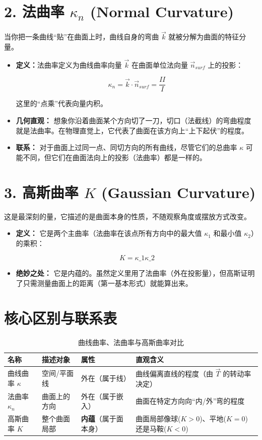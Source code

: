 \section{2. 法曲率 $\kappa_n$ (Normal Curvature)}
当你把一条曲线“贴”在曲面上时，曲线自身的弯曲 $\vec{k}$ 就被分解为曲面的特征分量。
\begin{itemize}
\item \textbf{定义：}法曲率定义为曲线曲率向量 $\vec{k}$ 在曲面单位法向量 $\vec{n}_{surf}$ 上的投影：

$$ \kappa_n = \vec{k} \cdot \vec{n}_{surf} = \frac{II}{I} $$

这里的“点乘”代表向量内积。
\item \textbf{几何直观：} 想象你沿着曲面某个方向切了一刀，切口（法截线）的弯曲程度就是法曲率。在物理直觉上，它代表了曲面在该方向上“上下起伏”的程度。

\item \textbf{联系：} 对于曲面上过同一点、同切方向的所有曲线，尽管它们的总曲率 $\kappa$ 可能不同，但它们在曲面法向上的投影（法曲率）都是一样的。
\end{itemize}
\section{3. 高斯曲率 $K$ (Gaussian Curvature)}
这是最深刻的量，它描述的是曲面本身的性质，不随观察角度或摆放方式改变。
\begin{itemize}
\item \textbf{定义：} 它是两个主曲率（法曲率在该点所有方向中的最大值 $\kappa_1$ 和最小值 $\kappa_2$）的乘积：

$$ K = \kappa\_1 \kappa\_2 $$
\item \textbf{绝妙之处：} 它是内蕴的。虽然定义里用了法曲率（外在投影量），但高斯证明了只需测量曲面上的距离（第一基本形式）就能算出来。
\end{itemize}
\section{核心区别与联系表}
\begin{table}[htbp]
\centering
\renewcommand{\arraystretch}{1.5}
\caption{曲线曲率、法曲率与高斯曲率对比}
\begin{tabular}{@{}llll@{}}
\toprule
\textbf{名称} & \textbf{描述对象} & \textbf{属性} & \textbf{直观含义} \\ \midrule
曲线曲率 $\kappa$ & 空间/平面线 & 外在（属于线） & 曲线偏离直线的程度（由 $\vec{T}$ 的转动率决定） \\
法曲率 $\kappa_n$ & 曲面上的方向 & 外在（属于嵌入） & 曲面在特定方向向“内/外”弯的程度 \\
高斯曲率 $K$ & 整个曲面局部 & \textbf{内蕴}（属于面本身） & 曲面局部像球($K>0$)、平地($K=0$)还是马鞍($K<0$) \\\bottomrule
\end{tabular}
\end{table}
